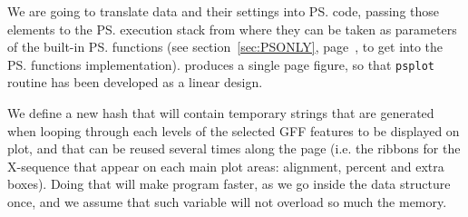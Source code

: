\documentclass[11pt]{article}
\def\nwendcode{\endtrivlist \endgroup} %
\let\nwdocspar=\par                    %
\begin{document}

We are going to translate data and their settings into {\ps} code, passing those elements to the {\ps} execution stack from where they can be taken as parameters of the built-in {\ps} functions (see section~\ref{sec:PSONLY}, page~\pageref{sec:PSONLY}, to get into the {\ps} functions implementation). {\prog} produces a single page figure, so that {\tt{}\protect{}ps{}plot} routine has been developed as a linear design.

We define a new hash that will contain temporary strings that are generated when looping through each levels of the selected GFF features to be displayed on plot, and that can be reused several times along the page (i.e. the ribbons for the X-sequence that appear on each main plot areas: alignment, percent and extra boxes). Doing that will make program faster, as we go inside the data structure once, and we assume that such variable will not overload so much the memory.

\nwenddocs{}\plusendmoddef
\eatline
{}\nwendcode{}\nwdocspar
\label{todo:IAD}\label{todo:IBD}
\nwenddocs{}%
%
%
\nwdocspar
\nwenddocs{}%
%
%
\nwdocspar
\todo{ \item \todoIAD
       \item \todoIBD } %
\end{document}
